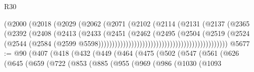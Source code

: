 \begin{lexlean}{R30}
\begin{coremodule}
                                                    (@2000
                                                      (@2018
                                                        (@2029
                                                          (@2062
                                                            (@2071
                                                              (@2102
                                                                (@2114
                                                                  (@2131
                                                                    (@2137
                                                                      (@2365
                                                                        (@2392
                                                                          (@2408
                                                                            (@2413
                                                                              (@2433
                                                                                (@2451
                                                                                  (@2462
                                                                                    (@2495
                                                                                      (@2504
                                                                                        (@2519
                                                                                          (@2524
                                                                                            (@2544
                                                                                              (@2584
                                                                                                (@2599
                                                                                                  @5598)))))))))))))))))))))))))))))))))))))))))))))))
@5677 := @90
    (@407
      (@418
        (@432
          (@449
            (@464
              (@475
                (@502
                  (@547
                    (@561
                      (@626
                        (@645
                          (@659
                            (@722
                              (@853
                                (@885
                                  (@955
                                    (@969
                                      (@986
                                        (@1030
                                          (@1093

\end{coremodule}
\end{lexlean}
